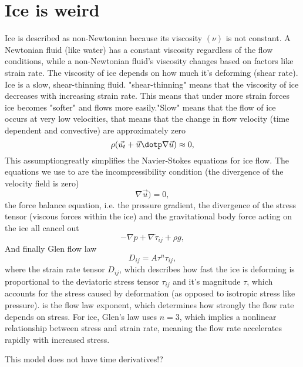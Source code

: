 \chapter{Ice is weird}
Ice is described as non-Newtonian because its viscosity $(\nu)$ is not constant. A Newtonian fluid (like water) has a constant viscosity regardless of the flow conditions, while a non-Newtonian fluid's viscosity changes based on factors like strain rate. The viscosity of ice depends on how much it’s deforming (shear rate).
Ice is a slow, shear-thinning fluid. "shear-thinning" means that the viscosity of ice decreases with increasing strain rate. This means that under more strain forces ice becomes "softer" and flows more easily."Slow" means that the flow of ice occurs at very low velocities, that means that the change in flow velocity (time dependent and convective) are approximately zero
\begin{equation}
\rho(\vec{u_t} + \vec{u} \dotp \nabla \vec{u}) \approx 0,
\end{equation}
This assumptiongreatly simplifies the Navier-Stokes equations for ice flow.
The equations we use to are the incompressibility condition (the divergence of the velocity field is zero)
\begin{equation}
\nabla \vec{u}) = 0,
\end{equation}
the force balance equation, i.e. the pressure gradient, the divergence of the stress tensor (viscous forces within the ice) and the gravitational body force acting on the ice all cancel out
\begin{equation}
-\nabla p + \nabla\dot\tau_{ij} + \rho g,
\end{equation}
And finally Glen flow law
\begin{equation}
D_{ij} = A\tau^{n} \tau_{ij},
\end{equation}
where the strain rate tensor $D_{ij}$, which describes how fast the ice is deforming is proportional to the deviatoric stress tensor $\tau_{ij}$ and it's magnitude $\tau$, which accounts for the stress caused by deformation (as opposed to isotropic stress like pressure). is the flow law exponent, which determines how strongly the flow rate depends on stress. For ice, Glen's law uses $n=3$, which implies a nonlinear relationship between stress and strain rate, meaning the flow rate accelerates rapidly with increased stress\cite{modelling_ppt}.

This model does not have time derivatives!?

